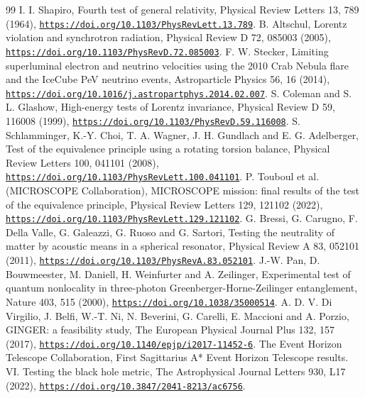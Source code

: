 \documentclass[pdflatex,sn-mathphys-num]{sn-jnl}
\theoremstyle{thmstyleone}
\theoremstyle{thmstyletwo}
\begin{document}
\begin{thebibliography}{99}
 I. I. Shapiro, Fourth test of general relativity, Physical Review Letters 13, 789 (1964), \href{https://doi.org/10.1103/PhysRevLett.13.789}{\nolinkurl{https://doi.org/10.1103/PhysRevLett.13.789}}.
 B. Altschul, Lorentz violation and synchrotron radiation, Physical Review D 72, 085003 (2005), \href{https://doi.org/10.1103/PhysRevD.72.085003}{\nolinkurl{https://doi.org/10.1103/PhysRevD.72.085003}}.
 F. W. Stecker, Limiting superluminal electron and neutrino velocities using the 2010 Crab Nebula flare and the IceCube PeV neutrino events, Astroparticle Physics 56, 16 (2014), \href{https://doi.org/10.1016/j.astropartphys.2014.02.007}{\nolinkurl{https://doi.org/10.1016/j.astropartphys.2014.02.007}}.
 S. Coleman and S. L. Glashow, High-energy tests of Lorentz invariance, Physical Review D 59, 116008 (1999), \href{https://doi.org/10.1103/PhysRevD.59.116008}{\nolinkurl{https://doi.org/10.1103/PhysRevD.59.116008}}.
 S. Schlamminger, K.-Y. Choi, T. A. Wagner, J. H. Gundlach and E. G. Adelberger, Test of the equivalence principle using a rotating torsion balance, Physical Review Letters 100, 041101 (2008), \href{https://doi.org/10.1103/PhysRevLett.100.041101}{\nolinkurl{https://doi.org/10.1103/PhysRevLett.100.041101}}.
 P. Touboul et al. (MICROSCOPE Collaboration), MICROSCOPE mission: final results of the test of the equivalence principle, Physical Review Letters 129, 121102 (2022), \href{https://doi.org/10.1103/PhysRevLett.129.121102}{\nolinkurl{https://doi.org/10.1103/PhysRevLett.129.121102}}.
 G. Bressi, G. Carugno, F. Della Valle, G. Galeazzi, G. Ruoso and G. Sartori, Testing the neutrality of matter by acoustic means in a spherical resonator, Physical Review A 83, 052101 (2011), \href{https://doi.org/10.1103/PhysRevA.83.052101}{\nolinkurl{https://doi.org/10.1103/PhysRevA.83.052101}}.
 J.-W. Pan, D. Bouwmeester, M. Daniell, H. Weinfurter and A. Zeilinger, Experimental test of quantum nonlocality in three-photon Greenberger-Horne-Zeilinger entanglement, Nature 403, 515 (2000), \href{https://doi.org/10.1038/35000514}{\nolinkurl{https://doi.org/10.1038/35000514}}.
 A. D. V. Di Virgilio, J. Belfi, W.-T. Ni, N. Beverini, G. Carelli, E. Maccioni and A. Porzio, GINGER: a feasibility study, The European Physical Journal Plus 132, 157 (2017), \href{https://doi.org/10.1140/epjp/i2017-11452-6}{\nolinkurl{https://doi.org/10.1140/epjp/i2017-11452-6}}.
 The Event Horizon Telescope Collaboration, First Sagittarius A* Event Horizon Telescope results. VI. Testing the black hole metric, The Astrophysical Journal Letters 930, L17 (2022), \href{https://doi.org/10.3847/2041-8213/ac6756}{\nolinkurl{https://doi.org/10.3847/2041-8213/ac6756}}.

\end{thebibliography}
\end{document}
